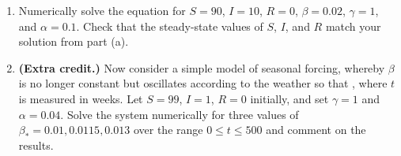 \documentclass[12pt]{article}
\begin{document}
\begin{enumerate}
\begin{enumerate}
	equilibrium values of $S$, $I$, and $R$ be? Discuss how this relates to
	your answers from lab Exercise 8.
      \item Numerically solve the equation for $S=90$, $I=10$, $R=0$,
	$\beta=0.02$, $\gamma=1$, and $\alpha=0.1$. Check that the steady-state
	values of $S$, $I$, and $R$ match your solution from part (a).
      \item \textbf{(Extra credit.)} Now consider a simple model of seasonal
	forcing, whereby $\beta$ is no longer constant but oscillates according
	to the weather so that , where $t$ is measured in weeks. Let $S=99$, $I=1$, $R=0$
	initially, and set $\gamma=1$ and $\alpha=0.04$. Solve the system
	numerically for three values of $\beta_*=0.01,0.0115,0.013$ over the
	range $0\le t \le 500$ and comment on the results.  
    \end{enumerate}
 

\end{enumerate}
\end{document}
